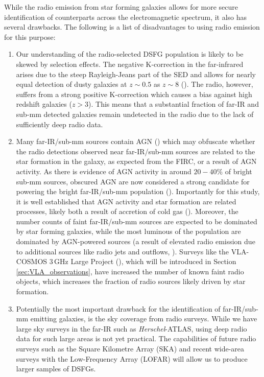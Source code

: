 While the radio emission from star forming galaxies allows for more secure identification of counterparts across the electromagnetic spectrum, it also has several drawbacks. The following is a list of disadvantages to using radio emission for this purpose:

\begin{enumerate}
    \item Our understanding of the radio-selected DSFG population is likely to be skewed by selection effects. The negative K-correction in the far-infrared arises due to the steep Rayleigh-Jeans part of the SED and allows for nearly equal detection of dusty galaxies at $z \sim 0.5$ as $z \sim 8$ (\citealt{Blain_2002}). The radio, however, suffers from a strong positive K-correction which causes a bias against high redshift galaxies ($z > 3$). This means that a substantial fraction of far-IR and sub-mm detected galaxies remain undetected in the radio due to the lack of sufficiently deep radio data.
    \item Many far-IR/sub-mm sources contain AGN (\citealt{Shanks_2021}) which may obfuscate whether the radio detections observed near far-IR/sub-mm sources are related to the star formation in the galaxy, as expected from the FIRC, or a result of AGN activity. As there is evidence of AGN activity in around $20 - 40\%$ of bright sub-mm sources, obscured AGN are now considered a strong candidate for powering the bright far-IR/sub-mm population (\citealt{Wang_2013, Cowie_2018, Franco_2018, Stach_2019}). Importantly for this study, it is well established that AGN activity and star formation are related processes, likely both a result of accretion of cold gas (\citealt{Vito_2014}). Moreover, the number counts of faint far-IR/sub-mm sources are expected to be dominated by star forming galaxies, while the most luminous of the population are dominated by AGN-powered sources (a result of elevated radio emission due to additional sources like radio jets and outflows, \citealt{Shanks_2021}). Surveys like the VLA-COSMOS $3\,$GHz Large Project (\citealt{Smolcic_2017a,Smolcic_2017b, Smolcic_2017c}), which will be introduced in Section \ref{sec:VLA_observations}, have increased the number of known faint radio objects, which increases the fraction of radio sources likely driven by star formation.
	\item Potentially the most important drawback for the identification of far-IR/sub-mm emitting galaxies, is the sky coverage from radio surveys. While we have large sky surveys in the far-IR such as \textit{Herschel}-ATLAS, using deep radio data for such large areas is not yet practical. The capabilities of future radio surveys such as the Square Kilometre Array (SKA) and recent wide-area surveys with the Low-Frequency Array (LOFAR) will allow us to produce larger samples of DSFGs.
\end{enumerate}

